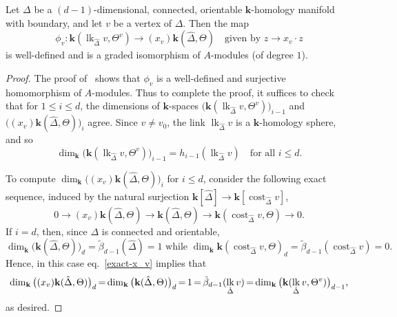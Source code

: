 \documentclass[ALCO,ThmDefs,Unicode,epreuves]{cedram}
\DeclareMathOperator\lk{lk}
\DeclareMathOperator\cost{cost}
\newcommand{\complet}[1]{\hat{#1}}
\newcommand{\field}{\mathbf{k}}
\newcommand*{\Mk}{\mkern -2mu}
\begin{document}
\begin{lemma} \label{analog-of-Prop4.24}
 Let $\Delta$ be a $(d-1)$-dimensional, connected, orientable $\field$-homology manifold with boundary, and let $v$ be a vertex of $\Delta$. Then 
the map
\[\phi_v: \field(\lk_{\complet{\Delta}}v, \Theta^v) \to (x_v)\field(\complet{\Delta},\Theta) \quad \mbox{given by } z \to x_v\cdot z
\]
is well-defined and is a graded isomorphism of $A$-modules (of degree $1$).
\end{lemma}
\begin{proof} The proof of~\cite[Proposition~4.24]{Swartz-09} shows that $\phi_v$ is a well-defined and surjective homomorphism of $A$-modules. Thus to complete the proof, it suffices to check that for $1\leq i\leq d$, the dimensions of $\field$-spaces $\big(\field(\lk_{\complet{\Delta}}v, \Theta^v)\big)_{i-1}$ and $\big((x_v)\field(\complet{\Delta},\Theta)\big)_i$ agree.
Since $v\neq v_0$, the link $\lk_{\complet{\Delta}}v$ is a $\field$-homology sphere, and so 
\begin{equation} \label{dim-lk}
\dim_\field \big(\field(\lk_{\complet{\Delta}}v, \Theta^v)\big)_{i-1}=h_{i-1}(\lk_{\complet{\Delta}}v) \quad \mbox{for all }i\leq d.
\end{equation}

To compute $\dim_\field \big((x_v)\field(\complet{\Delta},\Theta)\big)_i$ for $i\leq d$, consider the following exact sequence, induced by the natural surjection $\field[\complet{\Delta}]\to \field[\cost_{\complet{\Delta}}v]$, 
\begin{equation} \label{exact-x_v}
0\to (x_v)\field(\complet{\Delta},\Theta) \to \field(\complet{\Delta},\Theta) \to \field(\cost_{\complet{\Delta}}v, \Theta)\to 0.
\end{equation}
If $i=d$, then, since $\Delta$ is connected and orientable, 
\[
\dim_\field \big(\field(\complet{\Delta},\Theta)\big)_d=\tilde{\beta}_{d-1}(\complet{\Delta})=1 \mbox{ while } \dim_\field \field(\cost_{\complet{\Delta}}v, \Theta)_d=\tilde{\beta}_{d-1}(\cost_{\complet{\Delta}}v)=0.
\] 
Hence, in this case eq.~\eqref{exact-x_v} implies that
\[
\dim_\field \big((x_v)\field(\complet{\Delta},\Theta)\big)_d \Mk =\Mk \dim_\field \big(\field(\complet{\Delta},\Theta)\big)_d\Mk =\Mk 1
\Mk =\Mk \tilde{\beta}_{d-1}(\lk_{\complet{\Delta}}v)\Mk =\Mk \dim_\field \big(\field(\lk_{\complet{\Delta}}v, \Theta^v)\big)_{d-1},
\]
as desired. 


\end{proof}
\end{document}
